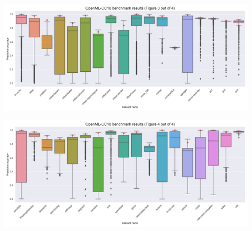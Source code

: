\documentclass[a0paper,portrait]{baposter}
\begin{document}
\begin{poster}
{\begin{minipage}{.5\textwidth}
\end{minipage}

\begin{minipage}{.5\textwidth}
  \centering
  \includegraphics[width=0.9\linewidth]{../img/openml-boxplot2-hdpi.png}

\end{minipage}%
\begin{minipage}{.5\textwidth}
  \centering
  \includegraphics[width=0.9\linewidth]{../img/openml-boxplot3-hdpi.png}

\end{minipage}
}

\end{poster}
\end{document}
